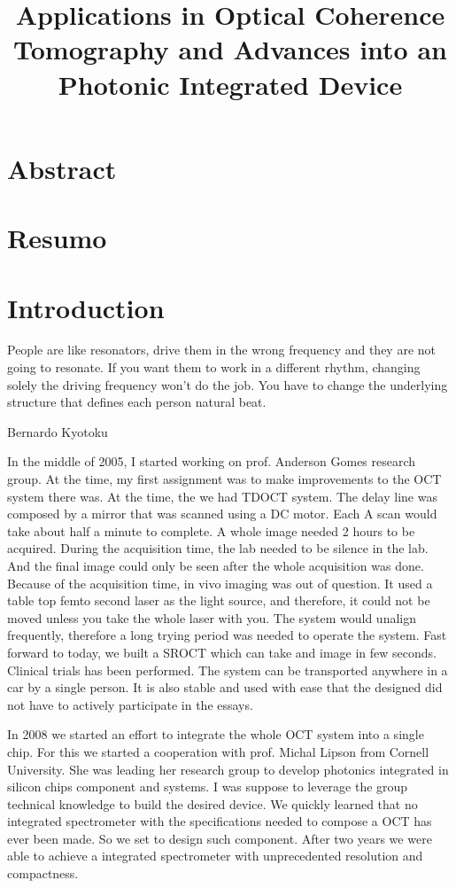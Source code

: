 \documentclass[12pt,twoside,english]{book}
\title{Applications in Optical Coherence Tomography and Advances into an Photonic Integrated Device}
\renewcommand{\~}{\perispomeni}%
\numberwithin{equation}{section}
\numberwithin{figure}{section}
\begin{document}
\chapter*{Abstract}

\chapter*{Resumo}

\tableofcontents{}

\chapter*{Introduction}

\epigraph{People are like resonators, drive them in the wrong frequency and they are not going to resonate. If you want them to work in a different rhythm, changing solely the driving frequency won't do the job. You have to change the underlying structure that defines each person natural beat.}{Bernardo Kyotoku}

In the middle of 2005, I started working on prof. Anderson Gomes research group. At the time, my first assignment was to make improvements to the \gls{OCT} system there was. At the time, the we had \gls{TDOCT} system. The delay line was composed by a mirror that was scanned using a DC motor. Each A scan would take about half a minute to complete. A whole image needed 2 hours to be acquired. During the acquisition time, the lab needed to be silence in the lab. And the final image could only be seen after the whole acquisition was done. Because of the acquisition time, in vivo imaging was out of question. It used a table top femto second laser as the light source, and therefore, it could not be moved unless you take the whole laser with you. The system would unalign frequently, therefore a long trying period was needed to operate the system. Fast forward to today, we built a \gls{SROCT} which can take and image in few seconds. Clinical trials has been performed. The system can be transported anywhere in a car by a single person. It is also stable and used with ease that the designed did not have to actively participate in the essays.

In 2008 we started an effort to integrate the whole \gls{OCT} system into a single chip. For this we started a cooperation with prof. Michal Lipson from Cornell University. She was leading her research group to develop photonics integrated in silicon chips component and systems. I was suppose to leverage the group technical knowledge to build the desired device. We quickly learned that no integrated spectrometer with the specifications needed to compose a OCT has ever been made. So we set to design such component. After two years we were able to achieve a integrated spectrometer with unprecedented resolution and compactness.
\end{document}
